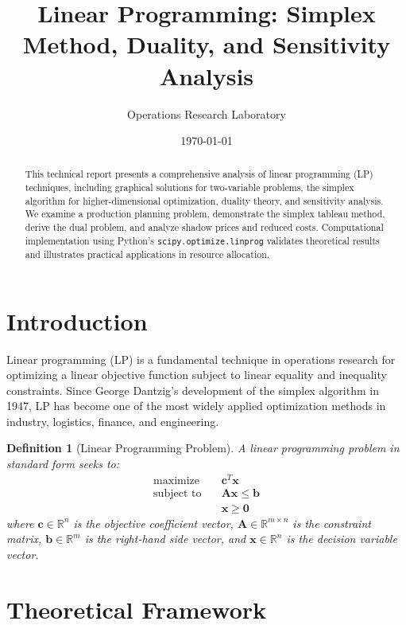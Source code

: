 \documentclass[a4paper, 11pt]{article}
\title{Linear Programming: Simplex Method, Duality, and Sensitivity Analysis}
\author{Operations Research Laboratory}
\date{\today}
\newtheorem{definition}{Definition}[section]
\begin{document}
\maketitle

\begin{abstract}
This technical report presents a comprehensive analysis of linear programming (LP) techniques,
including graphical solutions for two-variable problems, the simplex algorithm for
higher-dimensional optimization, duality theory, and sensitivity analysis. We examine a
production planning problem, demonstrate the simplex tableau method, derive the dual problem,
and analyze shadow prices and reduced costs. Computational implementation using Python's
\texttt{scipy.optimize.linprog} validates theoretical results and illustrates practical
applications in resource allocation.
\end{abstract}

\section{Introduction}

Linear programming (LP) is a fundamental technique in operations research for optimizing
a linear objective function subject to linear equality and inequality constraints. Since
George Dantzig's development of the simplex algorithm in 1947, LP has become one of the
most widely applied optimization methods in industry, logistics, finance, and engineering.

\begin{definition}[Linear Programming Problem]
A linear programming problem in standard form seeks to:
\begin{equation}
\begin{aligned}
\text{maximize} \quad & \mathbf{c}^T \mathbf{x} \\
\text{subject to} \quad & \mathbf{A}\mathbf{x} \leq \mathbf{b} \\
& \mathbf{x} \geq \mathbf{0}
\end{aligned}
\end{equation}
where $\mathbf{c} \in \mathbb{R}^n$ is the objective coefficient vector, $\mathbf{A} \in \mathbb{R}^{m \times n}$
is the constraint matrix, $\mathbf{b} \in \mathbb{R}^m$ is the right-hand side vector, and
$\mathbf{x} \in \mathbb{R}^n$ is the decision variable vector.
\end{definition}

\section{Theoretical Framework}
\end{document}
